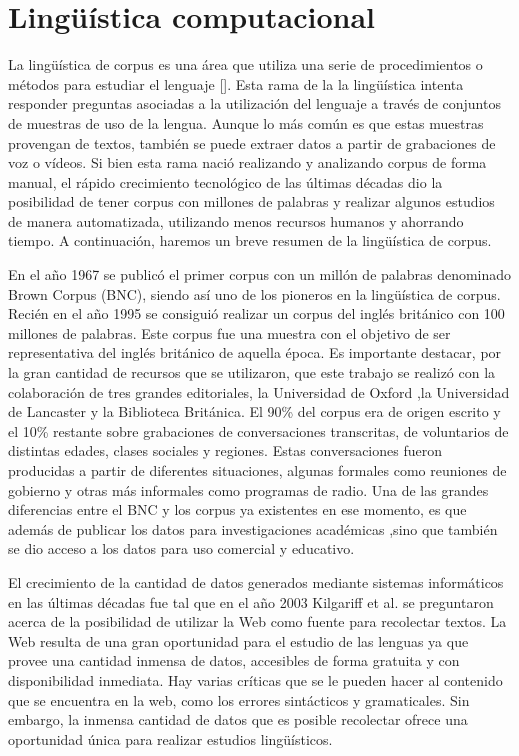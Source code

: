 

\section{Lingüística computacional} %
\label{linguistica_computacional}

La lingüística de corpus es una área que utiliza una serie de procedimientos o métodos para estudiar el lenguaje [\cite{mcenery2011corpus}]. Esta rama de la la lingüística intenta responder 
preguntas asociadas a la utilización del lenguaje a través de conjuntos de muestras de uso de la lengua. Aunque lo más común es que estas muestras provengan de textos, también se puede extraer datos a partir de grabaciones de voz o vídeos. Si bien esta rama nació realizando y analizando corpus de forma manual, el rápido crecimiento
tecnológico de las últimas décadas dio la posibilidad de tener corpus con millones de palabras y realizar algunos estudios de manera automatizada, utilizando menos recursos humanos y ahorrando tiempo. A continuación, haremos un breve resumen de la lingüística de corpus.

En el año 1967 se publicó el primer corpus con un millón de palabras denominado Brown Corpus (BNC), siendo así uno de los pioneros en la lingüística de corpus. Recién en el año 1995 se consiguió realizar un corpus del inglés británico con 100 millones de palabras. 
Este corpus fue una muestra con el objetivo de ser representativa del inglés británico de aquella época. 
Es importante destacar, por la gran cantidad de recursos que se utilizaron, que este trabajo se realizó con la colaboración de tres grandes editoriales, la Universidad de Oxford ,la Universidad de Lancaster y la Biblioteca Británica. 
El 90\% del corpus era de origen escrito y el 10\% restante sobre grabaciones de conversaciones transcritas, de voluntarios de distintas edades, clases sociales y regiones. 
Estas conversaciones fueron producidas a partir de diferentes situaciones, algunas formales como reuniones de gobierno y otras más informales como programas de radio. 
Una de las grandes diferencias entre el BNC y los corpus ya existentes en ese momento, es que además de publicar los datos para investigaciones académicas ,sino que también se dio acceso a los datos para uso comercial y educativo.

El crecimiento de la cantidad de datos generados mediante sistemas informáticos en las últimas décadas fue tal que en el año 2003 Kilgariff et al. \cite{kilgarriff2003introduction} se preguntaron acerca de la posibilidad de utilizar la Web como fuente para recolectar textos.
La Web resulta de una gran oportunidad para el estudio de las lenguas ya que provee una cantidad inmensa de datos, accesibles de forma gratuita y con disponibilidad inmediata. Hay varias críticas que se le pueden hacer al contenido que se encuentra en la web, como los errores sintácticos y  gramaticales. Sin embargo, la inmensa cantidad de datos que es posible recolectar ofrece una oportunidad única para realizar estudios lingüísticos.

